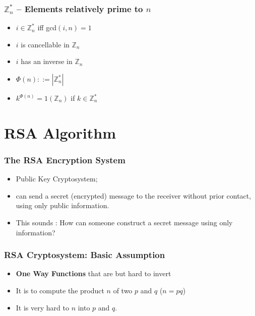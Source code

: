 \documentclass{beamer}
\begin{document}
\begin{frame}
  \frametitle{$\mathbb{Z}^*_n$ -- Elements relatively prime to $n$}

  {\larger
    \begin{itemize}
    \item $i \in \mathbb{Z}^*_n$ iff gcd$(i,n) = 1$
    \item $i$ is cancellable in $\mathbb{Z}_n$
    \item $i$ has an inverse in $\mathbb{Z}_n$

      \bigskip

    \item $\Phi(n) ::= |\mathbb{Z}^*_n|$
    \item {} $k^{\Phi(n)} = 1 (\mathbb{Z}_n)$
      if $k \in \mathbb{Z}^*_n$
    \end{itemize}
  }
\end{frame}


\section{RSA Algorithm}
\begin{frame}
  \frametitle{The RSA Encryption System}

  {\larger
    \begin{itemize}
    \item Public Key Cryptosystem;

      \bigskip
      
    \item<2->  can send a secret (encrypted)
      message to the receiver \alert{without prior contact,
        using only public information}.

      \bigskip
      
    \item<3-> This sounds : How can someone
      construct a \alert{secret} message using only
       information?

    \end{itemize}
  }
\end{frame}

\begin{frame}
  \frametitle{RSA Cryptosystem: Basic Assumption}

  {\larger
    \begin{itemize}
    \item {} {\bf One Way Functions}
      that are  but \alert{hard to invert}

      \vfill

    \item It is  to compute the product $n$ of
      two  $p$ and $q$ ($n = pq$)
      
      \bigskip

    \item It is \alert{very hard} to  $n$
      into $p$ and $q$.

    \end{itemize}
  }
\end{frame}
\end{document}
